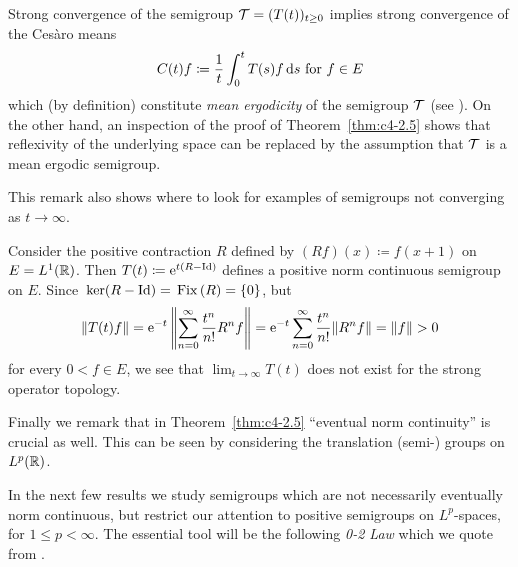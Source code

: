 Strong convergence of the semigroup $\TT = (T(t))_{t \geq 0}$ implies strong convergence of the Cesàro means 
\[
C(t)f \coloneq  \frac{1}{t}\int_{0}^{t} T(s)f \mathop{}\!\mathrm{d}{s} \text{ for } f \in E
\]
which (by definition) constitute \emph{mean ergodicity} of the semigroup $\mathcal{T}$ (see \textcite[Chap.5.1]{davies:1980}).
On the other hand, an inspection of the proof of Theorem~\ref{thm:c4-2.5} shows that reflexivity of the underlying space can be replaced by the assumption that $\mathcal{T}$ is a mean ergodic semigroup.

This remark also shows where to look for examples of semigroups not converging as $t \to \infty$.

Consider the positive contraction $R$ defined by $(Rf)(x) \coloneq f(x+1)$ on $E = L^{1}(\mathbb{R})$.
Then $T(t) \coloneq \mathrm{e}^{t(R-\operatorname{Id})}$ defines a positive norm continuous semigroup on $E$.
Since $\mathop{}\mathrm{ker}(R - \operatorname{Id}) = \mathop{}\mathrm{Fix}\left(R\right) = \{0\}$, but 
\[
\|T(t)f\| = \mathrm{e}^{-t} \left\|\sum_{n=0}^{\infty} \frac{t^n}{n!}R^{n}f\right\| = 
\mathrm{e}^{-t}\sum_{n=0}^{\infty} \frac{t^n}{n!}\|R^{n}f\|= \|f\| > 0
\] 
for every $0 < f \in E$, we see that $\lim_{t\to\infty} T(t)$ does not exist for the strong operator topology.

Finally we remark that in Theorem~\ref{thm:c4-2.5} \enquote{eventual norm continuity} is crucial as well.
This can be seen by considering the translation (semi-) groups on $L^{p}(\mathbb{R})$.

In the next few results we study semigroups which are not necessarily eventually norm continuous, but restrict our attention to positive semigroups on $L^{p}$-spaces, for $1 \leq p < \infty$.
The essential tool will be the following \emph{0-2 Law} which we quote from \textcite[Theorem~3.7]{greiner:1982}.

